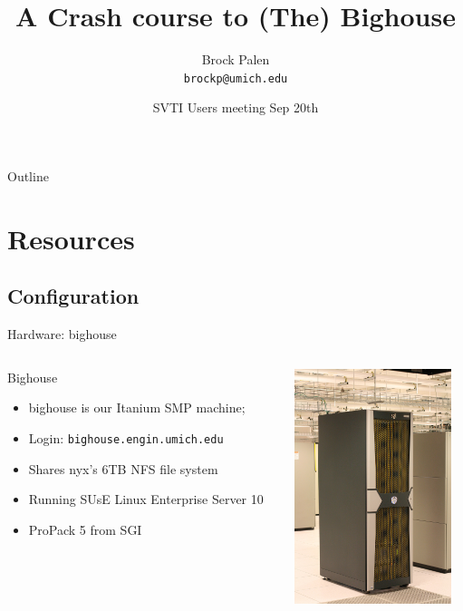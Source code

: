 \documentclass{beamer}
\title[Bighouse Crash] {A Crash course to (The) Bighouse}
\author{Brock Palen\\ \texttt{brockp@umich.edu}}
\date{SVTI Users meeting Sep 20th}
\begin{document}
  \begin{frame}
    \titlepage
  \end{frame}

  \begin{frame}{Outline}
    \tableofcontents
  \end{frame}
  
  \section{Resources}
  \subsection {Configuration}
  \begin{frame}{Hardware: bighouse}
   \begin{columns}[c]
    \begin{column}{7cm}
    \begin{block}{Bighouse}
    \begin{itemize}
      \item bighouse is our Itanium SMP machine;
      \item Login: \texttt{bighouse.engin.umich.edu}
      \item Shares nyx's 6TB NFS file system
      \item Running SUsE Linux Enterprise Server 10
      \item ProPack 5 from SGI
    \end{itemize}
   \end{block}
   \end{column}
   \begin{column}{5cm}
    \begin{center}\includegraphics[height=2.7in]{tallbighouse}\end{center}
   \end{column}
   \end{columns}
  \end{frame}
\end{document}
